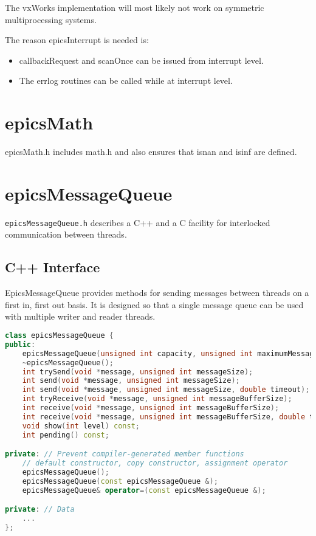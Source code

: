The vxWorks implementation will most likely not work on symmetric multiprocessing systems.

The reason epicsInterrupt is needed is:

\begin{itemize}
\item callbackRequest and scanOnce can be issued from interrupt level.

\item The errlog routines can be called while at interrupt level.

\end{itemize}

\section{epicsMath}

epicsMath.h includes math.h and also ensures that isnan and isinf are defined.

\section{epicsMessageQueue}

\verb|epicsMessageQueue.h| describes a C++ and a C facility for interlocked communication between threads.

\subsection{C++ Interface}

EpicsMessageQueue provides methods for sending messages between threads on a first in, first out basis.
It is designed so that a single message queue can be used with multiple writer and reader threads.

\begin{lstlisting}[language=C++]
class epicsMessageQueue {
public:
    epicsMessageQueue(unsigned int capacity, unsigned int maximumMessageSize);
    ~epicsMessageQueue();
    int trySend(void *message, unsigned int messageSize);
    int send(void *message, unsigned int messageSize);
    int send(void *message, unsigned int messageSize, double timeout);
    int tryReceive(void *message, unsigned int messageBufferSize);
    int receive(void *message, unsigned int messageBufferSize);
    int receive(void *message, unsigned int messageBufferSize, double timeout);
    void show(int level) const;
    int pending() const;

private: // Prevent compiler-generated member functions
    // default constructor, copy constructor, assignment operator
    epicsMessageQueue();
    epicsMessageQueue(const epicsMessageQueue &);
    epicsMessageQueue& operator=(const epicsMessageQueue &);

private: // Data
    ...
};
\end{lstlisting}

